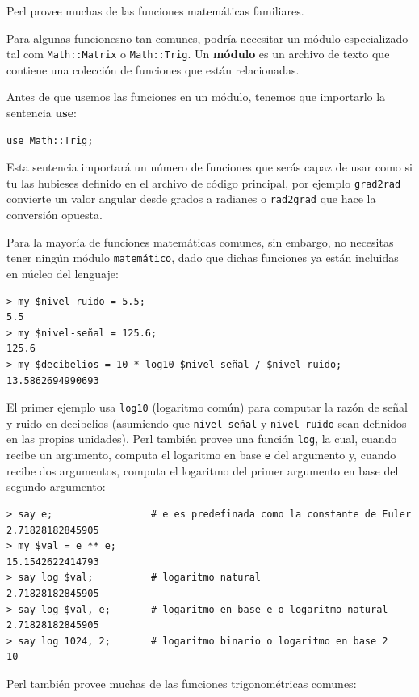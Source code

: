 Perl provee muchas de las funciones matemáticas familiares.

Para algunas funcionesno tan comunes, podría necesitar un
módulo especializado tal com \verb'Math::Matrix' o
\verb'Math::Trig'. Un {\bf módulo} es un archivo de texto 
que contiene una colección de funciones que están relacionadas.

Antes de que usemos las funciones en un módulo, tenemos que importarlo
la sentencia {\bf use}:

\begin{verbatim}
use Math::Trig;
\end{verbatim}
%
Esta sentencia importará un número de funciones que serás capaz de usar
como si tu las hubieses definido en el archivo de código principal,
por ejemplo \verb|grad2rad| convierte un valor angular desde grados
a radianes o \verb|rad2grad| que hace la conversión opuesta.

Para la mayoría de funciones matemáticas comunes, sin embargo, no necesitas
tener ningún módulo \verb|matemático|, dado que dichas funciones
ya están incluidas en núcleo del lenguaje:

\begin{verbatim}
> my $nivel-ruido = 5.5;
5.5
> my $nivel-señal = 125.6;
125.6
> my $decibelios = 10 * log10 $nivel-señal / $nivel-ruido;
13.5862694990693
\end{verbatim}
%
El primer ejemplo usa \verb"log10" (logaritmo común)
para computar la razón de señal y ruido en decibelios
(asumiendo que \verb|nivel-señal| y \verb|nivel-ruido| sean 
definidos en las propias unidades). Perl también provee una 
función {\tt log}, la cual, cuando recibe un argumento,
computa el logaritmo en base {\tt e} del argumento y,
cuando recibe dos argumentos, computa el logaritmo del primer
argumento en base del segundo argumento:

\begin{verbatim}
> say e;                 # e es predefinada como la constante de Euler
2.71828182845905
> my $val = e ** e;
15.1542622414793
> say log $val;          # logaritmo natural
2.71828182845905
> say log $val, e;       # logaritmo en base e o logaritmo natural
2.71828182845905
> say log 1024, 2;       # logaritmo binario o logaritmo en base 2
10
\end{verbatim}
%

Perl también provee muchas de las funciones trigonométricas
comunes:

